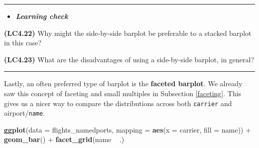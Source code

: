 \documentclass[]{tufte-book}
\newenvironment{Shaded}{\begin{snugshade}}{\end{snugshade}}
\newcommand{\KeywordTok}[1]{\textcolor[rgb]{0.13,0.29,0.53}{\textbf{{#1}}}}
\newcommand{\DataTypeTok}[1]{\textcolor[rgb]{0.13,0.29,0.53}{{#1}}}
\newcommand{\StringTok}[1]{\textcolor[rgb]{0.31,0.60,0.02}{{#1}}}
\newcommand{\NormalTok}[1]{{#1}}
\newenvironment{rmdblock}[1]
  {\begin{shaded*}
  \begin{itemize}
  \renewcommand{\labelitemi}{
    \raisebox{-.7\height}[0pt][0pt]{
    }
  }
  \item
  }
  {
  \end{itemize}
  \end{shaded*}
  }
\newenvironment{learncheck}
  {\begin{rmdblock}{warning}}
  {\end{rmdblock}}
\begin{document}
\begin{center}\rule{\linewidth}{\linethickness}\end{center}

\begin{learncheck}
\textbf{\emph{Learning check}}
\end{learncheck}

\textbf{(LC4.22)} Why might the side-by-side barplot be preferable to a
stacked barplot in this case?

\textbf{(LC4.23)} What are the disadvantages of using a side-by-side
barplot, in general?

\begin{center}\rule{\linewidth}{\linethickness}\end{center}

Lastly, an often preferred type of barplot is the \textbf{faceted
barplot}. We already saw this concept of faceting and small multiples in
Subsection \ref{faceting}. This gives us a nicer way to compare the
distributions across both \texttt{carrier} and airport/\texttt{name}.

\begin{Shaded}
\begin{Highlighting}[]
\KeywordTok{ggplot}\NormalTok{(}\DataTypeTok{data =} \NormalTok{flights_namedports, }\DataTypeTok{mapping =} \KeywordTok{aes}\NormalTok{(}\DataTypeTok{x =} \NormalTok{carrier, }\DataTypeTok{fill =} \NormalTok{name)) +}
\StringTok{  }\KeywordTok{geom_bar}\NormalTok{() +}
\StringTok{  }\KeywordTok{facet_grid}\NormalTok{(name ~}\StringTok{ }\NormalTok{.)}
\end{Highlighting}
\end{Shaded}
\end{document}
